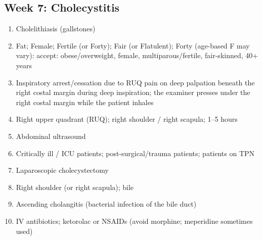 \documentclass[11pt,letterpaper]{article}
\begin{document}
\begin{keybox}
\hrulefill
\subsection*{Week 7: Cholecystitis}
\begin{enumerate}[leftmargin=1.5em,label=\textbf{\arabic*.},start=41]
  \item Cholelithiasis (gallstones)
  \item Fat; Female; Fertile (or Forty); Fair (or Flatulent); Forty (age-based F may vary):
        accept: obese/overweight, female, multiparous/fertile, fair-skinned, 40+ years
  \item Inspiratory arrest/cessation due to RUQ pain on deep palpation beneath the right
        costal margin during deep inspiration; the examiner presses under the right costal
        margin while the patient inhales
  \item Right upper quadrant (RUQ); right shoulder / right scapula; 1--5 hours
  \item Abdominal ultrasound
  \item Critically ill / ICU patients; post-surgical/trauma patients; patients on TPN
  \item Laparoscopic cholecystectomy
  \item Right shoulder (or right scapula); bile
  \item Ascending cholangitis (bacterial infection of the bile duct)
  \item IV antibiotics; ketorolac or NSAIDs (avoid morphine; meperidine sometimes used)
\end{enumerate}

\hrulefill

\end{keybox}
\end{document}
